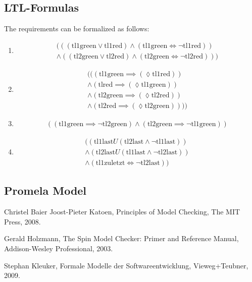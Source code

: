 \documentclass[a4paper, twoside]{article}
\begin{document}
\subsection{LTL-Formulas}
\label{sec:exampleltl}

The requirements can be formalized as follows:

\begin{enumerate}
\item 
  \begin{multline}
    (((\text{tl1green} \lor \text{tl1red}) \land (\text{tl1green}\iff \neg \text{tl1red})) \\ \land((\text{tl2green} \lor \text{tl2red})\land (\text{tl2green} \iff \neg \text{tl2red})))
  \end{multline}
\item
  \begin{multline}
    \label{eq:unnumbered}
    (((\text{tl1green} \implies (\lozenge \text{tl1red})) \\
    \land (\text{tlred} \implies (\lozenge \text{tl1green}))\\
    \land (\text{tl2green} \implies (\lozenge \text{tl2red})) \\
    \land (\text{tl2red} \implies (\lozenge \text{tl2green}))))
  \end{multline}
\item
  \begin{multline}
    \label{eq:unnumbered}
    ((\text{tl1green} \implies \neg \text{tl2green}) \land (\text{tl2green} \implies \neg \text{tl1green}))
  \end{multline}
\item
  \begin{multline}
    \label{eq:unnumbered}
    ((\text{tl1last} U(\text{tl2last} \land \neg \text{tl1last})) \\
    \land (\text{tl2last} U (\text{tl1last} \land \neg \text{tl2last}))\\
\land(\text{tl1zuletzt} \iff \neg \text{tl2last}))
  \end{multline}
\end{enumerate}

\subsection{Promela Model}
\label{sec:trafficlightsmodel}



\appendix

\begin{thebibliography}{9}
Christel Baier Joost-Pieter Katoen,
Principles of Model Checking,
The MIT Press,
2008.

Gerald Holzmann,
The Spin Model Checker: Primer and Reference Manual,
Addison-Wesley Professional,
2003.

Stephan Kleuker,
Formale Modelle der Softwareentwicklung,
Vieweg+Teubner,
2009.

\end{thebibliography}
\end{document}
